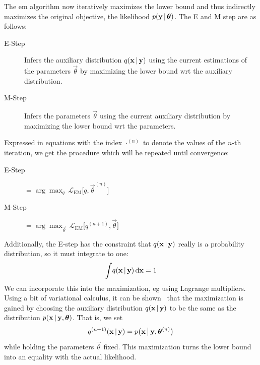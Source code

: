 	The \ac{em} algorithm now iteratively maximizes the lower bound and thus indirectly maximizes the original objective, the likelihood \( p(\boldsymbol{\mathrm{y}} \,\vert\, \boldsymbol{\mathrm{\theta}}) \). The E and M step are as follows:
	\begin{description}
		\item[E-Step] Infers the auxiliary distribution \( q(\boldsymbol{\mathrm{x}} \,\vert\, \boldsymbol{\mathrm{y}}) \) using the current estimations of the parameters \( \vec{\theta} \) by maximizing the lower bound \ac{wrt} the auxiliary distribution.
		\item[M-Step] Infers the parameters \(\vec{\theta}\) using the current auxiliary distribution by maximizing the lower bound \ac{wrt} the parameters.
	\end{description}
	Expressed in equations with the index \( \cdot^{(n)} \) to denote the values of the \(n\)-th iteration, we get the procedure which will be repeated until convergence:
	\begin{description}
		\item[E-Step]  \(\displaystyle = \arg\max_{q}\, \mathcal{L}_\mathrm{EM}\big[ q, \vec{\theta}^{(n)} \big] \)
		\item[M-Step]  \(\displaystyle = \arg\max_{\vec{\theta}}\, \mathcal{L}_\mathrm{EM}\big[ q^{(n + 1)}, \vec{\theta} \big] \)
	\end{description}
	Additionally, the E-step has the constraint that \(q(\boldsymbol{\mathrm{x}} \,\vert\, \boldsymbol{\mathrm{y}})\) really is a probability distribution, so it must integrate to one:
	\begin{align*}
		\int\! q(\boldsymbol{\mathrm{x}} \,\vert\, \boldsymbol{\mathrm{y}}) \dd{\boldsymbol{\mathrm{x}}} = 1
	\end{align*}
	We can incorporate this into the maximization, \ac{eg} using Lagrange multipliers. Using a bit of variational calculus, it can be shown~\cite{bealVariationalAlgorithmsApproximate2003a} that the maximization is gained by choosing the auxiliary distribution \(q(\boldsymbol{\mathrm{x}} \,\vert\, \boldsymbol{\mathrm{y}})\) to be the same as the distribution \( p(\boldsymbol{\mathrm{x}} \,\vert\, \boldsymbol{\mathrm{y}}, \boldsymbol{\mathrm{\theta}}) \). That is, we set
	\begin{align*}
		q^{(n + 1)}(\boldsymbol{\mathrm{x}} \,\vert\, \boldsymbol{\mathrm{y}}) = p\big(\boldsymbol{\mathrm{x}} \,\big\vert\, \boldsymbol{\mathrm{y}}, \boldsymbol{\mathrm{\theta}}^{(n)}\big)
	\end{align*}
	while holding the parameters \(\vec{\theta}\) fixed. This maximization turns the lower bound into an equality with the actual likelihood.

